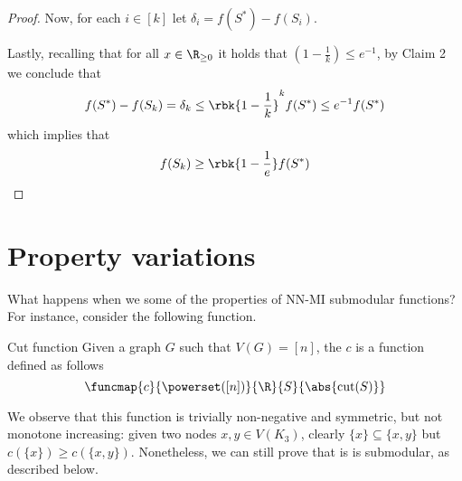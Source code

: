 \documentclass[a4paper, 12pt]{report}
\begin{document}
\begin{proof}
        Now, for each $i \in [k]$ let $\delta_i = f(S^*) - f(S_i)$.


        Lastly, recalling that for all $x \in \R_{\ge 0}$ it holds that $(1 - \tfrac{1}{k}) \le e^{-1}$, by Claim 2 we conclude that $$f(S^*) - f(S_k) = \delta_k \le \rbk{1 - \dfrac{1}{k}}^k f(S^*) \le e^{-1}f(S^*)$$ which implies that $$f(S_k) \ge \rbk{1 - \dfrac{1}{e}} f(S^*)$$
    \end{proof}

    \section{Property variations}

    What happens when we  some of the properties of NN-MI submodular functions? For instance, consider the following function.

    \begin{frameddefn}{Cut function}
        Given a graph $G$ such that $V(G) = [n]$, the  $c$ is a function defined as follows $$\funcmap{c}{\powerset([n])}{\R}{S}{\abs{\mathrm{cut}(S)}}$$
    \end{frameddefn}

    We observe that this function is trivially non-negative and symmetric, but not monotone increasing: given two nodes $x, y \in V(K_3)$, clearly $\{x\} \subseteq \{x, y\}$ but $c(\{x\}) \ge c(\{x, y\})$. Nonetheless, we can still prove that is is submodular, as described below.
\end{document}
